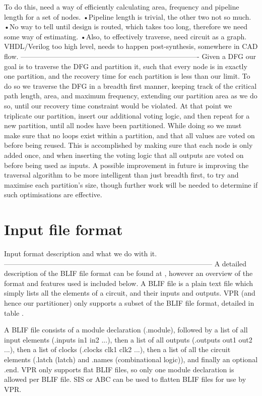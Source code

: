 \documentclass[12pt,draft,a4paper,oneside]{memoir} %
\begin{document}
To do this, need a way of efficiently calculating area, frequency and pipeline length for a set of nodes.
•Pipeline length is trivial, the other two not so much.
•No way to tell until design is routed, which takes too long, therefore we need some way of estimating.
•Also, to effectively traverse, need circuit as a graph. VHDL/Verilog too high level, needs to happen post-synthesis, somewhere in CAD flow.
----------------------------------------------------------------------------
Given a \ac{DFG} our goal is to traverse the \ac{DFG} and partition it, such that every node is in exactly one partition, and the recovery time for each partition is less than our limit.
To do so we traverse the \ac{DFG} in a breadth first manner, keeping track of the critical path length, area, and maximum frequency, extending our partition area as we do so, until our recovery time constraint would be violated. At that point we triplicate our partition, insert our additional voting logic, and then repeat for a new partition, until all nodes have been partitioned.  While doing so we must make sure that no loops exist within a partition, and that all values are voted on before being reused. This is accomplished by making sure that each node is only added once, and when inserting the voting logic that all outputs are voted on before being used as inputs.
A possible improvement in future is improving the traversal algorithm to be more intelligent than just breadth first, to try and maximise each partition's size, though further work will be needed to determine if such optimisations are effective.

\section{Input file format}
Input format description and what we do with it.
-----------------------------------------------------------------------------------------
A detailed description of the \ac{BLIF} file format can be found at , however an overview of the format and features used is included below.
A \ac{BLIF} file is a plain text file which simply lists all the elements of a circuit, and their inputs and outputs. \ac{VPR} (and hence our partitioner) only supports a subset of the \ac{BLIF} file format, detailed in table .

A \ac{BLIF} file consists of a module declaration (.module), followed by a list of all input elements (.inputs in1 in2 ...), then a list of all outputs (.outputs out1 out2 ...), then a list of clocks (.clocks clk1 clk2 ...), then a list of all the circuit elements (.latch (latch) and .names (combinational logic)), and finally an optional .end.
\ac{VPR} only supports flat \ac{BLIF} files, so only one module declaration is allowed per \ac{BLIF} file. \ac{SIS} or \ac{ABC}  can be used to flatten \ac{BLIF}
 files for use by \ac{VPR}.
\end{document}
